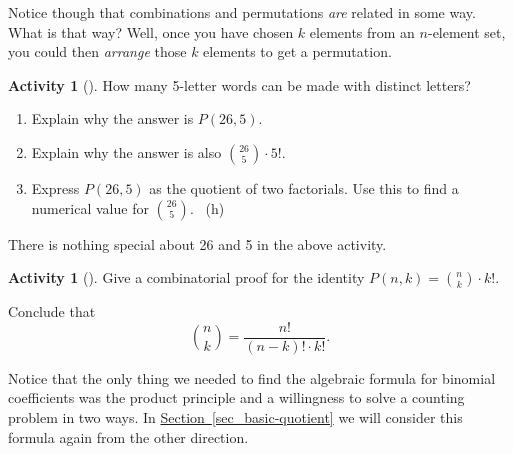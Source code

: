 \documentclass[10pt,]{book}
\theoremstyle{plain}
\theoremstyle{definition}
\theoremstyle{definition}
\theoremstyle{definition}
\newtheorem{activity}[project]{Activity}
\numberwithin{equation}{chapter}
\begin{document}
\hypertarget{p-665}{}%
Notice though that combinations and permutations \emph{are} related in some way.  What is that way?  Well, once you have chosen \(k\) elements from an \(n\)-element set, you could then \emph{arrange} those \(k\) elements to get a permutation.%
\begin{activity}[]\label{activity-85}
\hypertarget{p-666}{}%
How many 5-letter words can be made with distinct letters?%
\begin{enumerate}[font=\bfseries,label=(\alph*),ref=\alph*]
\item\label{task-136} \hypertarget{p-667}{}%
Explain why the answer is \(P(26,5)\).%
\item\label{task-137} \hypertarget{p-668}{}%
Explain why the answer is also \(\binom{26}{5}\cdot 5!\).%
\item\label{task-138} \hypertarget{p-669}{}%
Express \(P(26,5)\) as the quotient of two factorials.  Use this to find a numerical value for \(\binom{26}{5}\).%
~{\tiny (h)}\end{enumerate}
\end{activity}
\hypertarget{p-671}{}%
There is nothing special about 26 and 5 in the above activity.%
\begin{activity}[]\label{act-binomformula}
\hypertarget{p-672}{}%
Give a combinatorial proof for the identity \(P(n,k) = \binom{n}{k}\cdot k!\).%
\par
\hypertarget{p-673}{}%
Conclude that%
\begin{equation*}
\binom{n}{k} = \frac{n!}{(n-k)!\cdot k!}\text{.}
\end{equation*}
%
\end{activity}
\hypertarget{p-674}{}%
Notice that the only thing we needed to find the algebraic formula for binomial coefficients was the product principle and a willingness to solve a counting problem in two ways.  In \hyperref[sec_basic-quotient]{Section~\ref{sec_basic-quotient}} we will consider this formula again from the other direction.%
\typeout{************************************************}
\typeout{************************************************}
\end{document}
